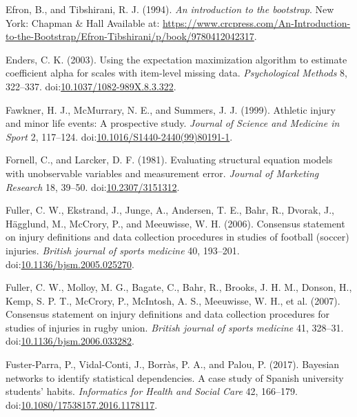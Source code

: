\documentclass[
  english,
  man,floatsintext]{apa6}
\newlength{\cslhangindent}
\newenvironment{cslreferences}%
  {\setlength{\parindent}{0pt}%
  \everypar{\setlength{\hangindent}{\cslhangindent}}\ignorespaces}%
  {\par}
\begin{document}
\begin{cslreferences}
\leavevmode\hypertarget{ref-Efron1993}{}%
Efron, B., and Tibshirani, R. J. (1994). \emph{An introduction to the bootstrap}. New York: Chapman \& Hall Available at: \url{https://www.crcpress.com/An-Introduction-to-the-Bootstrap/Efron-Tibshirani/p/book/9780412042317}.

\leavevmode\hypertarget{ref-Enders2003}{}%
Enders, C. K. (2003). Using the expectation maximization algorithm to estimate coefficient alpha for scales with item-level missing data. \emph{Psychological Methods} 8, 322--337. doi:\href{https://doi.org/10.1037/1082-989X.8.3.322}{10.1037/1082-989X.8.3.322}.

\leavevmode\hypertarget{ref-Fawkner1999}{}%
Fawkner, H. J., McMurrary, N. E., and Summers, J. J. (1999). Athletic injury and minor life events: A prospective study. \emph{Journal of Science and Medicine in Sport} 2, 117--124. doi:\href{https://doi.org/10.1016/S1440-2440(99)80191-1}{10.1016/S1440-2440(99)80191-1}.

\leavevmode\hypertarget{ref-Fornell1981}{}%
Fornell, C., and Larcker, D. F. (1981). Evaluating structural equation models with unobservable variables and measurement error. \emph{Journal of Marketing Research} 18, 39--50. doi:\href{https://doi.org/10.2307/3151312}{10.2307/3151312}.

\leavevmode\hypertarget{ref-Fuller2006}{}%
Fuller, C. W., Ekstrand, J., Junge, A., Andersen, T. E., Bahr, R., Dvorak, J., Hägglund, M., McCrory, P., and Meeuwisse, W. H. (2006). Consensus statement on injury definitions and data collection procedures in studies of football (soccer) injuries. \emph{British journal of sports medicine} 40, 193--201. doi:\href{https://doi.org/10.1136/bjsm.2005.025270}{10.1136/bjsm.2005.025270}.

\leavevmode\hypertarget{ref-Fuller2007b}{}%
Fuller, C. W., Molloy, M. G., Bagate, C., Bahr, R., Brooks, J. H. M., Donson, H., Kemp, S. P. T., McCrory, P., McIntosh, A. S., Meeuwisse, W. H., et al. (2007). Consensus statement on injury definitions and data collection procedures for studies of injuries in rugby union. \emph{British journal of sports medicine} 41, 328--31. doi:\href{https://doi.org/10.1136/bjsm.2006.033282}{10.1136/bjsm.2006.033282}.

\leavevmode\hypertarget{ref-Fuster-Parra2017}{}%
Fuster-Parra, P., Vidal-Conti, J., Borràs, P. A., and Palou, P. (2017). Bayesian networks to identify statistical dependencies. A case study of Spanish university students' habits. \emph{Informatics for Health and Social Care} 42, 166--179. doi:\href{https://doi.org/10.1080/17538157.2016.1178117}{10.1080/17538157.2016.1178117}.


\end{cslreferences}
\end{document}
